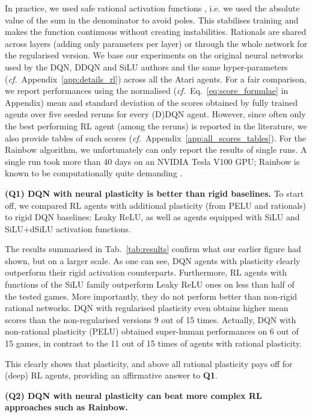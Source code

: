 \documentclass[accepted]{article}
\theoremstyle{plain}
\theoremstyle{definition}
\theoremstyle{remark}
\newcommand{\cf}{\emph{cf.}~}
\begin{document}
In practice, we used safe rational activation functions \citep{molina2019pad}, i.e. we used the absolute value of the sum in the denominator to avoid poles. 
This stabilises training and makes the function continuous without creating instabilities. Rationals are shared across layers (adding only  parameters per layer) or through the whole network for the regularised version. We base our experiments on the original neural networks used by the DQN, DDQN and SiLU authors and the same hyper-parameters (\cf Appendix~\ref{app:details_rl}) across all the Atari agents.
For a fair comparison, we report performances using the normalised (\cf Eq.~\ref{eq:score_formulae} in Appendix) mean and standard deviation of the scores obtained by fully trained agents over five seeded reruns for every (D)DQN agent.  However, since often only the best performing RL agent (among the reruns) is reported in the literature, we also provide tables of such scores (\cf Appendix~\ref{app:all_scores_tables}). For the Rainbow algorithm, we unfortunately can only report the results of single runs. A single run took more than 40 days on an NVIDIA Tesla V100 GPU; Rainbow is known to be computationally quite demanding \citep{ObandoCeron2021RevisitingRP}.

{\bf (Q1) DQN with neural plasticity is better than rigid baselines.} 
To start off, we compared RL agents with additional plasticity (from PELU and rationals) to rigid DQN baselines: Leaky ReLU, as well as agents equipped with SiLU and SiLU+dSiLU activation functions.

The results summarised in Tab.~\ref{tab:results} confirm what our earlier figure had shown, but on a larger scale. As one can see, DQN agents with plasticity clearly outperform their rigid activation counterparts. Furthermore, RL agents with functions of the SiLU family outperform Leaky ReLU ones on less than half of the tested games. More importantly, they do not perform better than non-rigid rational networks. DQN with regularised plasticity even obtains higher mean scores than the non-regularised versions 9 out of 15 times. 
Actually, DQN with non-rational plasticity (PELU) obtained super-human performances on 6 out of 15 games, in contrast to the 11 out of 15 times of agents with rational plasticity.

This clearly shows that plasticity, and above all rational plasticity pays off for (deep) RL agents, providing an affirmative answer to \textbf{Q1}.


{\bf (Q2) DQN with neural plasticity can beat more complex RL approaches such as Rainbow.} 
\end{document}
